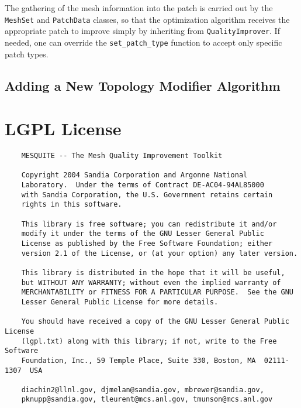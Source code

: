 The
gathering of the mesh information into the patch is
carried out by the \texttt{MeshSet} and \texttt{PatchData} classes, so that the
optimization algorithm receives the appropriate patch to improve
simply by inheriting from \texttt{QualityImprover}.  If needed, one can 
override the \texttt{set\_patch\_type} function to accept only specific
patch types.

\subsection{Adding a New Topology Modifier Algorithm}

\section{LGPL License}
\begin{verbatim}
    MESQUITE -- The Mesh Quality Improvement Toolkit
 
    Copyright 2004 Sandia Corporation and Argonne National
    Laboratory.  Under the terms of Contract DE-AC04-94AL85000
    with Sandia Corporation, the U.S. Government retains certain
    rights in this software.
 
    This library is free software; you can redistribute it and/or
    modify it under the terms of the GNU Lesser General Public
    License as published by the Free Software Foundation; either
    version 2.1 of the License, or (at your option) any later version.
 
    This library is distributed in the hope that it will be useful,
    but WITHOUT ANY WARRANTY; without even the implied warranty of
    MERCHANTABILITY or FITNESS FOR A PARTICULAR PURPOSE.  See the GNU
    Lesser General Public License for more details.
 
    You should have received a copy of the GNU Lesser General Public License
    (lgpl.txt) along with this library; if not, write to the Free Software
    Foundation, Inc., 59 Temple Place, Suite 330, Boston, MA  02111-1307  USA
  
    diachin2@llnl.gov, djmelan@sandia.gov, mbrewer@sandia.gov,
    pknupp@sandia.gov, tleurent@mcs.anl.gov, tmunson@mcs.anl.gov
    
\end{verbatim}


